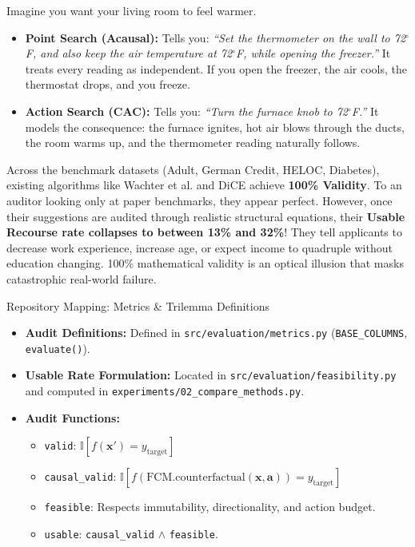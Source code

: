 \documentclass[11pt,a4paper]{article}
\begin{document}
\begin{analogybox}
Imagine you want your living room to feel warmer.
\begin{itemize}[leftmargin=1.2em]
    \item \textbf{Point Search (Acausal):} Tells you: \emph{``Set the thermometer on the wall to 72$^\circ$F, and also keep the air temperature at 72$^\circ$F, while opening the freezer.''} It treats every reading as independent. If you open the freezer, the air cools, the thermostat drops, and you freeze.
    \item \textbf{Action Search (CAC):} Tells you: \emph{``Turn the furnace knob to 72$^\circ$F.''} It models the consequence: the furnace ignites, hot air blows through the ducts, the room warms up, and the thermometer reading naturally follows.
\end{itemize}
\end{analogybox}

\begin{warningbox}
Across the benchmark datasets (Adult, German Credit, HELOC, Diabetes), existing algorithms like Wachter et al. and DiCE achieve \textbf{100\% Validity}. To an auditor looking only at paper benchmarks, they appear perfect. 
However, once their suggestions are audited through realistic structural equations, their \textbf{Usable Recourse rate collapses to between 13\% and 32\%}! 
They tell applicants to decrease work experience, increase age, or expect income to quadruple without education changing. 100\% mathematical validity is an optical illusion that masks catastrophic real-world failure.
\end{warningbox}

\begin{codeanatomy}{Repository Mapping: Metrics \& Trilemma Definitions}
\begin{itemize}[leftmargin=1.2em]
    \item \textbf{Audit Definitions:} Defined in \texttt{src/evaluation/metrics.py} (\texttt{BASE\_COLUMNS}, \texttt{evaluate()}).
    \item \textbf{Usable Rate Formulation:} Located in \texttt{src/evaluation/feasibility.py} and computed in \texttt{experiments/02\_compare\_methods.py}.
    \item \textbf{Audit Functions:}
    \begin{itemize}
        \item \texttt{valid}: $\mathbb{I}[f(\mathbf{x}') = y_{\text{target}}]$
        \item \texttt{causal\_valid}: $\mathbb{I}[f(\mathrm{FCM}.\text{counterfactual}(\mathbf{x}, \mathbf{a})) = y_{\text{target}}]$
        \item \texttt{feasible}: Respects immutability, directionality, and action budget.
        \item \texttt{usable}: \texttt{causal\_valid} $\land$ \texttt{feasible}.
    \end{itemize}
\end{itemize}
\end{codeanatomy}
\end{document}
